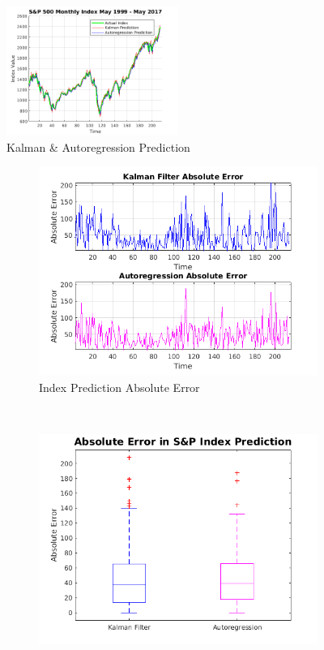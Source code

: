 \documentclass[11pt, fleqn]{article}
\begin{document}
\begin{figure}[!h]
  	\centering
  	\includegraphics[width=0.5\textwidth]{kalman-autoreg-pred.png}
	\caption{Kalman \& Autoregression Prediction}
	\label{fig:kalman-autoreg-pred}
\end{figure}

\begin{figure}[!h]
    \centering
    \begin{subfigure}[b]{0.45\textwidth}
        \includegraphics[width=\textwidth]{kalman-autoreg-error.png}
		\caption{Index Prediction Absolute Error}
		\label{fig:kalman-autoreg-error}
    \end{subfigure}
    ~ 
    \begin{subfigure}[b]{0.42\textwidth}
        \includegraphics[width=\textwidth]{kalman-autoreg-error-boxplot.png}

\end{subfigure}
\end{figure}
\end{document}
